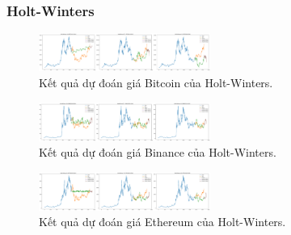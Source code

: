 \subsubsection{Holt-Winters}
\begin{figure}[h]
    \centering
    \includegraphics[width=0.5\textwidth]{bibliography/pictures/HWbtc.png}
    \caption{Kết quả dự đoán giá Bitcoin của Holt-Winters.}
\end{figure}
\begin{figure}[h]
    \centering
    \includegraphics[width=0.5\textwidth]{bibliography/pictures/HWbnb.png}
    \caption{Kết quả dự đoán giá Binance của Holt-Winters.}
\end{figure}
\begin{figure}[h]
    \centering
    \includegraphics[width=0.5\textwidth]{bibliography/pictures/HWeth.png}
    \caption{Kết quả dự đoán giá Ethereum của Holt-Winters.}
\end{figure}